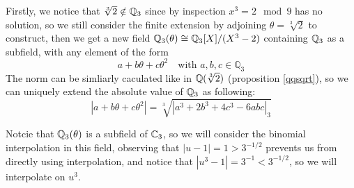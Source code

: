 Firstly, we notice that \(\sqrt[3]{2} \notin \mathbb{Q}_3\) since by inspection \(x^3 = 2 \mod 9\) has no solution, so we still consider the finite extension by adjoining \(\theta = \sqrt[3]{2}\) to construct, then we get a new field \(\mathbb{Q}_3(\theta) \cong \mathbb{Q}_3[X]/(X^3-2)\) containing \(\mathbb{Q}_3\) as a subfield, with any element of the form
\[a+b\theta +c \theta^2 \quad  \text{with } a,b,c  \in \mathbb{Q}_3\]
The norm can be simliarly caculated like in \(\mathbb{Q}(\sqrt[3]{2})\) (proposition \ref{qqsqrt}), so we can uniquely extend the absolute value of \(\mathbb{Q}_3\) as following:
    \[|a+b\theta+c\theta^2| = \sqrt[3]{|a^3+2b^3+4c^3-6abc|_3}\]


    Notcie that \(\mathbb{Q}_3(\theta)\) is a subfield of \(\mathbb{C}_3\), so we will consider the binomial interpolation in this field, observing that \(|u-1| =1 > 3^{-1/2}\) prevents us from directly using interpolation, and notice that \(|u^3-1| = 3^{-1} < 3^{-1/2}\), so we will interpolate on \(u^3\).

